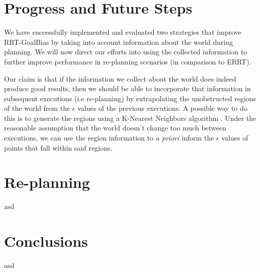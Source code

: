 \documentclass[10pt,twoside,twocolumn]{article}
\begin{document}
\section{Progress and Future Steps}

We have successfully implemented and evaluated two strategies that improve RRT-GoalBias by
taking into account information about the world during planning. We will now
direct our efforts into using the collected information to further improve performance
in re-planning scenarios (in comparison to ERRT). 

Our claim is that if the information we collect
about the world does indeed produce good results, then we should be able to incorporate that
information in subsequent executions (i.e re-planning) by extrapolating the unobstructed regions of
the world from the $\epsilon$ values of the previous executions. A possible way to do this is
to generate the regions using a K-Nearest Neighbors algorithm \cite{citeulike:995135}. Under the reasonable assumption
that the world doesn't change too much between executions, we can use the region information to
\emph{a priori} inform the $\epsilon$ values of points that fall
within said regions.

\section{Re-planning}

asd

\section{Conclusions}

asd

{}


\appendix 
\end{document}
